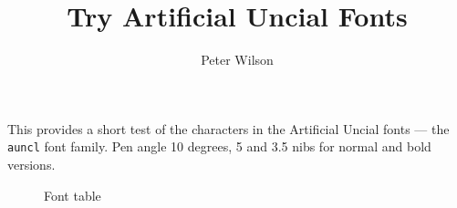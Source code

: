 \documentclass{article}
\title{Try Artificial Uncial Fonts}
\author{Peter Wilson}
\date{}
\begin{document}
\maketitle

    This provides a short test of the characters in the Artificial Uncial fonts
--- the \verb?auncl? font family. Pen angle 10 degrees, 5 and 3.5 nibs for 
normal and bold versions.


\begin{figure}
\decimals\nohexoct
\centering
\caption{Font table}
\end{figure}

\regulartext{\aunclfamily}
\end{document}
